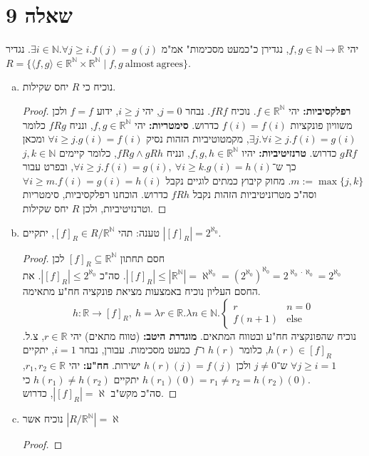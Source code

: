\documentclass[]{article}
\newcommand\N     {\mathbb{N}}
\newcommand\R     {\mathbb{R}}
\newcommand\other {\text{else}}
\newcommand\ra    {\rangle}
\newcommand\la    {\langle}
\newcommand\az    {\aleph_0}
\newcommand\uaz   {^{\aleph_0}}
\newcommand\al    {\aleph}
\newcommand\taz   {2^{\aleph_0}}
\begin{document}
	\section*{שאלה 9}
	יהי $ f, g \in \N \to \R $, נגדירן כ"כמעט מסכימות" אמ"מ $ \exists i \in \N. \forall j \ge i. f(j) = g(j) $. נגדיר $ R = \{\la f, g \ra \in \R^\N \times \R^\N \mid f, g \ \mathrm{almost \ agrees} \} $. 
	\begin{enumerate}[(a)]
		\item נוכיח כי $ R $ יחס שקילות. \begin{proof}
			\textbf{רפלקסיביות: }יהי $ f \in \R^\N $. נוכיח $ fRf $. נבחר $ j = 0 $, יהי $ i \ge j $, ידוע $ f = f $ ולכן משוויון פונקציות $ f(i) = f(i) $ כדרוש. \textbf{סימטריות: }יהי $ f, g \in \R^\N $, ונניח $ fRg $ כלומר $ \exists j. \forall i \ge j. f(i) = g(i) $, מקמטוטיביות הזהות נסיק $ \forall i \ge j. g(i) = f(i) $ ומכאן $ gRf $ כדרוש. \textbf{טרנזיטיביות: }יהיו $ f, g, h \in \R^\N $, ונניח $ fRg \land gRh $, כלומר קיימים $ j, k \in \N $ כך ש־$ \forall i \ge j. f(i) = g(i), \ \forall i \ge k. g(i) = h(i) $, ובפרט עבור $ m := \max\{j, k\} $. מחוק קיבוץ כמתים לוגיים נקבל $ \forall i \ge m. f(i) =  g(i) = h(i) $ וסה"כ מטרזניטיביות הזהות נקבל $ fRh $ כדרוש. הוכחנו רפלקסיביות, סימטריות וטרנזיטיביות, ולכן $ R $ יחס שקילות. 
		\end{proof}
		\item טענה: תהי $ [f]_R \in R / \R^\N $, יתקיים $ |[f]_R| = \taz $. \begin{proof}
			חסם תחתון $ [f]_R \subseteq \R^\N $ לכן
			$ |[f]_R| \le |\R^\N| = \al\uaz = (2^{\az})\uaz = 2^{\az \cdot \az} = \taz $. סה"כ $ |[f]_R| \le \taz $. 
			את החסם העליון נוכיח באמצעות מציאת פונקציה חח"ע מתאימה. 
			\[ h \colon \R \to [f]_R, \ h = \lambda r \in \R. \lambda n \in \N. \begin{cases}
				r & n = 0 \\
				f(n + 1) & \other
			\end{cases} \]
			נוכיח שהפונקציה חח"ע ובטווח המתאים. \textbf{מוגדרת היטב: }(טווח מתאים) יהי $ r \in \R $, צ.ל. $ h(r) \in [f]_R $, כלומר $ h(r) $ ו־$ f $ כמעט מסכימות. עבורן, נבחר $ i = 1 $, יתקיים $ \forall j \ge i = 1 $ ש־$ j \neq 0 $ ולכן $ h(r)(j) = f(j) $ ישירות. \textbf{חח"ע: }יהי $ r_1, r_2 \in \R $, יתקיים $ h(r_1) \neq h(r_2) $ כי $ h(r_1)(0) = r_1 \neq r_2 = h(r_2)(0) $. \\
			סה"כ מקש"ב $ |[f]_R| = \al $, כדרוש. 
		\end{proof}
		\item נוכיח אשר $ |R / \R^\N| = \al $ \begin{proof}

\end{proof}
\end{enumerate}
\end{document}
